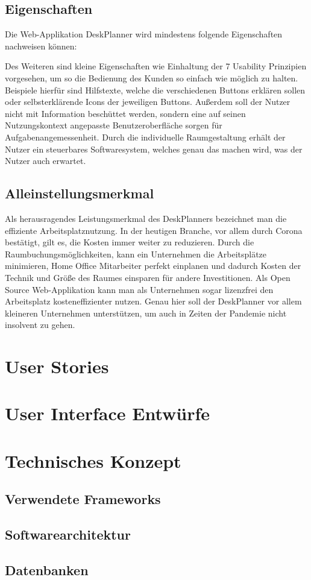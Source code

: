 \documentclass{article}
\begin{document}
\subsection{Eigenschaften}
Die Web-Applikation DeskPlanner wird mindestens folgende Eigenschaften nachweisen können:


Des Weiteren sind kleine Eigenschaften wie Einhaltung der 7 Usability Prinzipien
vorgesehen, um so die Bedienung des Kunden so einfach wie möglich zu halten. 
Beispiele hierfür sind Hilfstexte, welche die verschiedenen Buttons erklären sollen
oder selbsterklärende Icons der jeweiligen Buttons. Außerdem soll der Nutzer nicht
mit Information beschüttet werden, sondern eine auf seinen Nutzungskontext
angepasste Benutzeroberfläche sorgen für Aufgabenangemessenheit. Durch die 
individuelle Raumgestaltung erhält der Nutzer ein steuerbares Softwaresystem,
welches genau das machen wird, was der Nutzer auch erwartet.

\subsection{Alleinstellungsmerkmal}
Als herausragendes Leistungsmerkmal des DeskPlanners bezeichnet man die 
effiziente Arbeitsplatznutzung. In der heutigen Branche, vor allem durch Corona 
bestätigt, gilt es, die Kosten immer weiter zu reduzieren. Durch die 
Raumbuchungsmöglichkeiten, kann ein Unternehmen die Arbeitsplätze minimieren, Home Office
Mitarbeiter perfekt einplanen und dadurch Kosten der Technik und Größe des Raumes
einsparen für andere Investitionen. Als Open Source Web-Applikation kann man
als Unternehmen sogar lizenzfrei den Arbeitsplatz kosteneffizienter nutzen.
Genau hier soll der DeskPlanner vor allem kleineren Unternehmen unterstützen, um 
auch in Zeiten der Pandemie nicht insolvent zu gehen.

\section{User Stories}

\section{User Interface Entwürfe}

\section{Technisches Konzept}

\subsection{Verwendete Frameworks}

\subsection{Softwarearchitektur}

\subsection{Datenbanken}

% 


\end{document}
